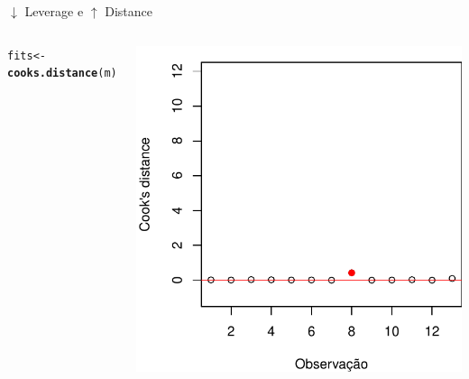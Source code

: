 \documentclass{beamer}\usepackage[]{graphicx}\usepackage[]{color}
\makeatletter
\newcommand{\hlstd}[1]{\textcolor[rgb]{0.345,0.345,0.345}{#1}}%
\newcommand{\hlkwb}[1]{\textcolor[rgb]{0.69,0.353,0.396}{#1}}%
\newcommand{\hlkwd}[1]{\textcolor[rgb]{0.737,0.353,0.396}{\textbf{#1}}}%
\newenvironment{kframe}{%
 \def\at@end@of@kframe{}%
 \ifinner\ifhmode%
  \def\at@end@of@kframe{\end{minipage}}%
  \begin{minipage}{\columnwidth}%
 \fi\fi%
 \def\FrameCommand##1{\hskip\@totalleftmargin \hskip-\fboxsep
 \colorbox{shadecolor}{##1}\hskip-\fboxsep
     \hskip-\linewidth \hskip-\@totalleftmargin \hskip\columnwidth}%
 \MakeFramed {\advance\hsize-\width
   \@totalleftmargin\z@ \linewidth\hsize
   \@setminipage}}%
 {\par\unskip\endMakeFramed%
 \at@end@of@kframe}
\newenvironment{knitrout}{}{} %
\renewenvironment{knitrout}{\setlength{\topsep}{0mm}}{}
\makeatother
\begin{document}
\begin{frame}{$\downarrow$ Leverage e $\uparrow$ Distance}
\begin{columns}[c]
\begin{knitrout}\tiny
{}\color{fgcolor}\begin{kframe}
\begin{alltt}
\hlstd{fits} \hlkwb{<-} \hlkwd{cooks.distance}\hlstd{(m)}
\end{alltt}
\end{kframe}
\includegraphics[width=1\linewidth]{figure/inf20-1} 

\end{knitrout}

\end{columns}
\end{frame}
\end{document}
